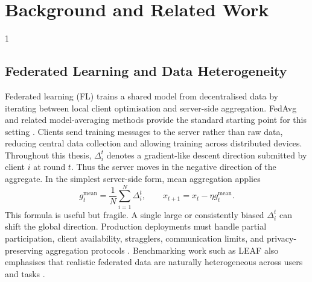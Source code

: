 \doublespacing %

\chapter{Background and Related Work}
\label{ch2}

\begin{spacing}{1}
\minitoc
\end{spacing}
\thesisspacing

\section{Federated Learning and Data Heterogeneity}

Federated learning (FL) trains a shared model from decentralised data by
iterating between local client optimisation and server-side aggregation.
FedAvg and related model-averaging methods provide the standard starting point
for this setting \cite{DBLP:journals/corr/McMahanMRA16,pmlr-v54-mcmahan17a}.
Clients send training messages to the server rather than raw data, reducing
central data collection and allowing training across distributed devices.
Throughout this thesis, \(\Delta_i^t\) denotes a gradient-like descent
direction submitted by client \(i\) at round \(t\). Thus the server moves in the
negative direction of the aggregate. In the simplest server-side form, mean
aggregation applies
\begin{equation}
    g_t^{\mathrm{mean}} = \frac{1}{N}\sum_{i=1}^{N}\Delta_i^t,
    \qquad
    x_{t+1}=x_t-\eta g_t^{\mathrm{mean}} .
    \label{eq:related-mean}
\end{equation}
This formula is useful but fragile. A single large or consistently biased
\(\Delta_i^t\) can shift the
global direction. Production deployments must handle partial participation,
client availability, stragglers, communication limits, and privacy-preserving
aggregation protocols \cite{bonawitz2019federatedscale,wang2021fieldguide}.
Benchmarking work such as LEAF also emphasises that realistic federated data
are naturally heterogeneous across users and tasks \cite{caldas2018leaf}.

